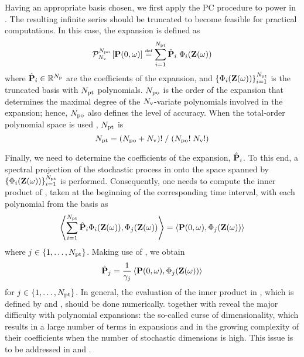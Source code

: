 Having an appropriate basis chosen, we first apply the PC procedure to power in . The resulting infinite series should be truncated to become feasible for practical computations. In this case, the expansion is defined as
\begin{equation} \elabel{pc-expansion}
  \oPC{\vars}{\pcorder}{\vP(0, \o)} \eqdef \sum_{i = 1}^{\pcterms} \pcc{\vP}_i \; \pcb_i(\vZ(\o))
\end{equation}
where $\hat{\mathbf{P}}_i \in \mathbb{R}^{N_\text{p}}$ are the coefficients of the expansion, and $\{ \Phi_i(\mathbf{Z}(\omega)) \}_{i = 1}^{{N_\text{pt}}}$ is the truncated basis with ${N_\text{pt}}$ polynomials. ${N_\text{po}}$ is the order of the expansion that determines the maximal degree of the ${N_\text{v}}$-variate polynomials involved in the expansion; hence, ${N_\text{po}}$ also defines the level of accuracy. When the total-order polynomial space is used \cite{beck2011}, ${N_\text{pt}}$ is
\begin{equation} \elabel{pc-terms}
  \pcterms = {(\pcorder + \vars)!} \; / \; {(\pcorder! \; \vars!)}
\end{equation}

Finally, we need to determine the coefficients of the expansion, $\hat{\mathbf{P}}_i$. To this end, a spectral projection of the stochastic process in  onto the space spanned by $\{ \Phi_i(\mathbf{Z}(\omega)) \}_{i = 1}^{{N_\text{pt}}}$ is performed. Consequently, one needs to compute the inner product of , taken at the beginning of the corresponding time interval, with each polynomial from the basis as
\[
  \oInner{\sum_{i=1}^{\pcterms} \pcc{\vP}_i \pcb_i(\vZ(\o))}{\pcb_j(\vZ(\o))} = \oInner{\vP(0, \o)}{\pcb_j(\vZ(\o))}
\]
where $j \in \{ 1, \dotsc, {N_\text{pt}} \}$. Making use of , we obtain
\begin{equation} \elabel{pc-coefficients}
  \pcc{\vP}_j = \frac{1}{\pcn_j} \oInner{\vP(0, \o)}{\pcb_j(\vZ(\o))}
\end{equation}
for $j \in \{ 1, \dotsc, {N_\text{pt}} \}$. In general, the evaluation of the inner product in , which is defined by  and , should be done numerically.  together with  reveal the major difficulty with polynomial expansions: the so-called curse of dimensionality, which results in a large number of terms in expansions and in the growing complexity of their coefficients when the number of stochastic dimensions is high. This issue is to be addressed in  and .

